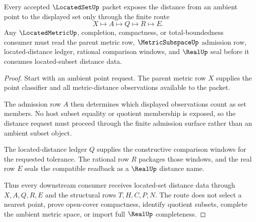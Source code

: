 \begin{theorem}
\label{thm:located-set-distance-handoff}
Every accepted $\LocatedSetUp$ packet exposes the distance from an ambient point to the displayed set only through the finite route
$$
X\longmapsto A\longmapsto Q\longmapsto R\longmapsto E .
$$
Any $\LocatedMetricUp$, completion, compactness, or total-boundedness consumer must read the parent metric row, $\MetricSubspaceUp$ admission row, located-distance ledger, rational comparison windows, and $\RealUp$ seal before it consumes located-subset distance data.
\end{theorem}
\begin{proof}
Start with an ambient point request. The parent metric row $X$ supplies the point classifier and all metric-distance observations available to the packet.

The admission row $A$ then determines which displayed observations count as set members. No host subset equality or quotient membership is exposed, so the distance request must proceed through the finite admission surface rather than an ambient subset object.

The located-distance ledger $Q$ supplies the constructive comparison windows for the requested tolerance. The rational row $R$ packages those windows, and the real row $E$ seals the compatible readback as a $\RealUp$ distance name.

Thus every downstream consumer receives located-set distance data through $X,A,Q,R,E$ and the structural rows $T,H,C,P,N$. The route does not select a nearest point, prove open-cover compactness, identify quotient subsets, complete the ambient metric space, or import full $\RealUp$ completeness.
\end{proof}

